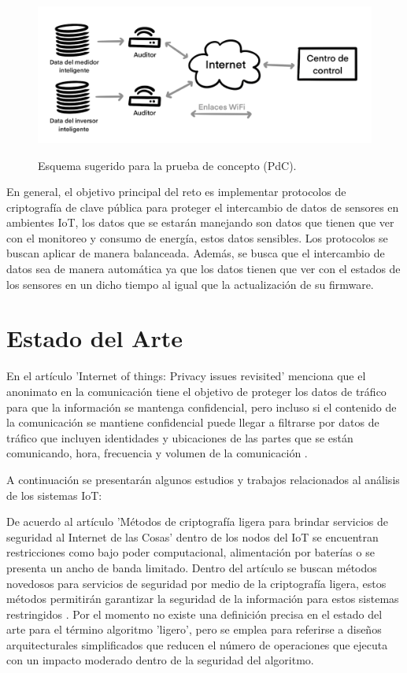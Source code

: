 \documentclass{article}
\begin{document}
             \begin{figure}[h]
                \centering
                \includegraphics[scale=0.35]{img/esquema_reto.png}\\
                \caption{Esquema sugerido para la prueba de concepto (PdC).}
                \label{fig:esquema}
            \end{figure}

            En general, el objetivo principal del reto es implementar protocolos de criptografía de clave pública para proteger el intercambio de datos de sensores en ambientes IoT, los datos que se estarán manejando son datos que tienen que ver con el monitoreo y consumo de energía, estos datos sensibles. Los protocolos se buscan aplicar de manera balanceada. Además, se busca que el intercambio de datos sea de manera automática ya que los datos tienen que ver con el estados de los sensores en un dicho tiempo al igual que la actualización de su firmware.

    \section{Estado del Arte} \label{sec:introduction}

        En el artículo 'Internet of things: Privacy issues revisited' menciona que el anonimato en la comunicación tiene el objetivo de proteger los datos de tráfico para que la información se mantenga confidencial, pero incluso si el contenido de la comunicación se mantiene confidencial puede llegar a filtrarse por datos de tráfico que incluyen identidades y ubicaciones de las partes que se están comunicando, hora, frecuencia y volumen de la comunicación \cite{Weber}.

        A continuación se presentarán algunos estudios y trabajos relacionados al análisis de los sistemas IoT:

        De acuerdo al artículo 'Métodos de criptografía ligera para brindar servicios de seguridad al Internet de las Cosas' dentro de los nodos del IoT se encuentran restricciones como bajo poder computacional, alimentación por baterías o se presenta un ancho de banda limitado. Dentro del artículo se buscan métodos novedosos para servicios de seguridad por medio de la criptografía ligera, estos métodos permitirán garantizar la seguridad de la información para estos sistemas restringidos \cite{criptografia_ligera}.
        Por el momento no existe una definición precisa en el estado del arte para el término algoritmo 'ligero', pero se emplea para referirse a diseños arquitecturales simplificados que reducen el número de operaciones que ejecuta con un impacto moderado dentro de la seguridad del algoritmo.
\end{document}
